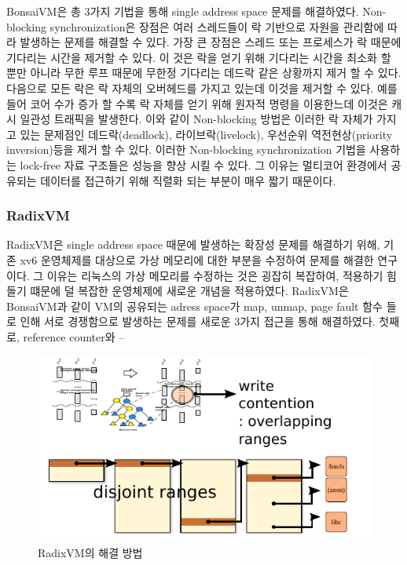  
BonsaiVM은 총 3가지 기법을 통해 single address space 문제를 해결하였다. 
Non-blocking synchronization은 장점은 여러 스레드들이 락 기반으로 자원을 관리함에 따라
 발생하는 문제를 해결할 수 있다. 
가장 큰 장점은 스레드 또는 프로세스가 락 때문에 기다리는 시간을 제거할 수 있다.
이 것은 락을 얻기 위해 기다리는 시간을 최소화 할 뿐만 아니라 무한 루프 때문에 무한정 기다리는 
데드락 같은 상황까지 제거 할 수 있다. 
다음으로 모든 락은 락 자체의 오버헤드를 가지고 있는데 이것을 제거할 수 있다. 
예를 들어 코어 수가 증가 할 수록 락 자체를 얻기 위해 원자적 명령을 이용한느데 이것은 캐시 일관성 트래픽을 
발생한다. 
이와 같이 Non-blocking 방법은 이러한 락 자체가 가지고 있는 문제점인 데드락(deadlock), 라이브락(livelock), 
우선순위 역전현상(priority inversion)등을 제거 할 수 있다. 
이러한 Non-blocking synchronization 기법을 사용하는 lock-free 자료 구조들은 성능을 향상 시킬 수 있다. 
그 이유는 멀티코어 환경에서 공유되는 데이터를 접근하기 위해 직렬화 되는 부분이 매우 짧기 때문이다. 


\subsubsection{RadixVM}

RadixVM은 single address space 때문에 발생하는 확장성 문제를 해결하기 위해, 
기존 xv6 운영체제를 대상으로 가상 메모리에 대한 부분을 수정하여 문제를 해결한 연구이다.
그 이유는 리눅스의 가상 메모리를 수정하는 것은 굉잡히 복잡하여,  적용하기 힘들기 떄문에 
덜 복잡한 운영체제에 새로운 개념을 적용하였다. 
RadixVM은 BonsaiVM과 같이 VM의 공유되는 adress space가 map, unmap, page fault 함수 들로 인해 
서로 경쟁함으로 발생하는 문제를 새로운 3가지 접근을 통해 해결하였다. 
첫째로, reference counter와 
--
\begin{figure}[h!]
    \centering
    \includegraphics[width=1\textwidth]{fig/radix/radix}
    \caption{RadixVM의 해결 방법}
  \label{fig:radix}
\end{figure}



